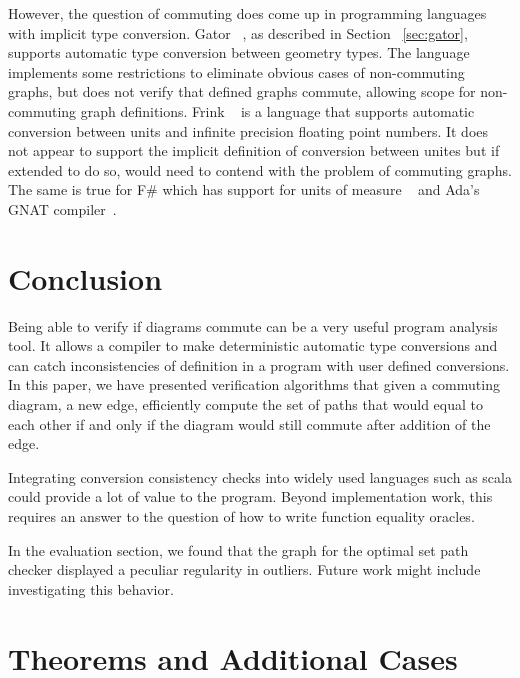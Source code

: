 \documentclass[sigplan,review,anonymous]{acmart}
\begin{document}
{However, the question of commuting does come up in programming languages with implicit type conversion.
Gator ~\cite{gator}, as described in Section ~\ref{sec:gator}, supports automatic type conversion between geometry types.
The language implements some restrictions to eliminate obvious cases of non-commuting graphs, but does not verify that defined graphs commute, allowing scope for non-commuting graph definitions.
Frink ~\cite{frink} is a language that supports automatic conversion between units and infinite precision floating point numbers.
It does not appear to support the implicit definition of conversion between unites  but if extended to do so, would need to contend with the problem of commuting graphs.
The same is true for F\# which has support for units of measure ~\cite{unitsOfMeasure} and Ada's GNAT compiler~\cite{gnat}.

\section{Conclusion}

Being able to verify if diagrams commute can be a very useful program analysis tool.
It allows a compiler to make deterministic automatic type conversions and can catch inconsistencies of definition in a program with user defined conversions.
In this paper, we have presented verification algorithms that given a commuting diagram, a new edge, efficiently compute the set of paths that would equal to each other if and only if the diagram would still commute after addition of the edge.

Integrating conversion consistency checks into widely used languages such as scala could provide a lot of value to the program.
Beyond implementation work, this requires an answer to the question of how to write function equality oracles.

In the evaluation section, we found that the graph for the optimal set path checker displayed a peculiar regularity in outliers.
Future work might include investigating this behavior.




\appendix

\section{Theorems and Additional Cases}

}
\end{document}
